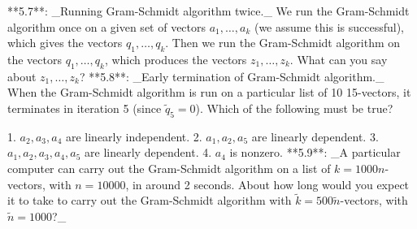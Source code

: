 

**5.7**: _Running Gram-Schmidt algorithm twice._ We run the Gram-Schmidt algorithm once on a given set of vectors \(a_{1},\ldots,a_{k}\) (we assume this is successful), which gives the vectors \(q_{1},\ldots,q_{k}\). Then we run the Gram-Schmidt algorithm on the vectors \(q_{1},\ldots,q_{k}\), which produces the vectors \(z_{1},\ldots,z_{k}\). What can you say about \(z_{1},\ldots,z_{k}\)?
**5.8**: _Early termination of Gram-Schmidt algorithm._ When the Gram-Schmidt algorithm is run on a particular list of 10 15-vectors, it terminates in iteration 5 (since \(\tilde{q}_{5}=0\)). Which of the following must be true?

1. \(a_{2},a_{3},a_{4}\) are linearly independent.
2. \(a_{1},a_{2},a_{5}\) are linearly dependent.
3. \(a_{1},a_{2},a_{3},a_{4},a_{5}\) are linearly dependent.
4. \(a_{4}\) is nonzero.
**5.9**: _A particular computer can carry out the Gram-Schmidt algorithm on a list of \(k=1000\)\(n\)-vectors, with \(n=10000\), in around 2 seconds. About how long would you expect it to take to carry out the Gram-Schmidt algorithm with \(\tilde{k}=500\)\(\tilde{n}\)-vectors, with \(\tilde{n}=1000\)?_
